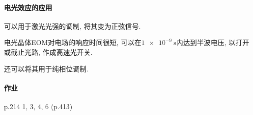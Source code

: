 \documentclass{ctexart}
\begin{document}
\paragraph{电光效应的应用} %
\label{par:电光效应的应用}

可以用于激光光强的调制, 将其变为正弦信号. 
\par
电光晶体EOM对电场的响应时间很短, 可以在$\SI{1e-9}{\second}$内达到半波电压, 以打开或截止光路, 作成高速光开关.
\par
还可以将其用于纯相位调制.


\paragraph{作业} %
\label{par:作业}

p.214 1, 3, 4, 6 (p.413)




\end{document}
